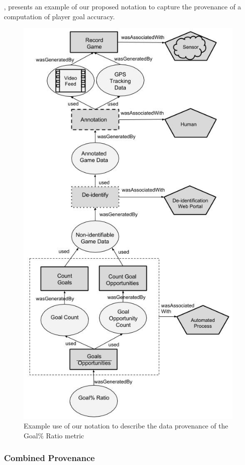 , presents an example of our proposed
notation to capture the provenance of a computation of player goal
accuracy.

\begin{figure}[!htb]
\centering
\includegraphics[width=0.7\linewidth]{figs/paper/image6.jpg}
\caption{Example use of our notation to describe the data provenance of the Goal\% Ratio metric}
\label{WorkflowProv}
\end{figure}

\clearpage{}

\subsubsection{Combined Provenance}

